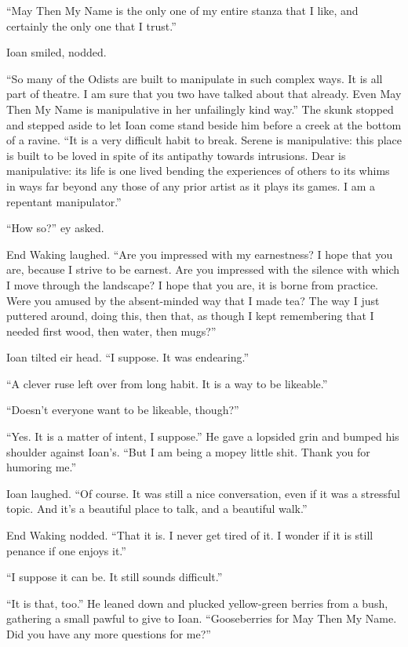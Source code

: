 ``May Then My Name is the only one of my entire stanza that I like, and certainly the only one that I trust.''

Ioan smiled, nodded.

``So many of the Odists are built to manipulate in such complex ways. It is all part of theatre. I am sure that you two have talked about that already. Even May Then My Name is manipulative in her unfailingly kind way.'' The skunk stopped and stepped aside to let Ioan come stand beside him before a creek at the bottom of a ravine. ``It is a very difficult habit to break. Serene is manipulative: this place is built to be loved in spite of its antipathy towards intrusions. Dear is manipulative: its life is one lived bending the experiences of others to its whims in ways far beyond any those of any prior artist as it plays its games. I am a repentant manipulator.''

``How so?'' ey asked.

End Waking laughed. ``Are you impressed with my earnestness? I hope that you are, because I strive to be earnest. Are you impressed with the silence with which I move through the landscape? I hope that you are, it is borne from practice. Were you amused by the absent-minded way that I made tea? The way I just puttered around, doing this, then that, as though I kept remembering that I needed first wood, then water, then mugs?''

Ioan tilted eir head. ``I suppose. It was endearing.''

``A clever ruse left over from long habit. It is a way to be likeable.''

``Doesn't everyone want to be likeable, though?''

``Yes. It is a matter of intent, I suppose.'' He gave a lopsided grin and bumped his shoulder against Ioan's. ``But I am being a mopey little shit. Thank you for humoring me.''

Ioan laughed. ``Of course. It was still a nice conversation, even if it was a stressful topic. And it's a beautiful place to talk, and a beautiful walk.''

End Waking nodded. ``That it is. I never get tired of it. I wonder if it is still penance if one enjoys it.''

``I suppose it can be. It still sounds difficult.''

``It is that, too.'' He leaned down and plucked yellow-green berries from a bush, gathering a small pawful to give to Ioan. ``Gooseberries for May Then My Name. Did you have any more questions for me?''

